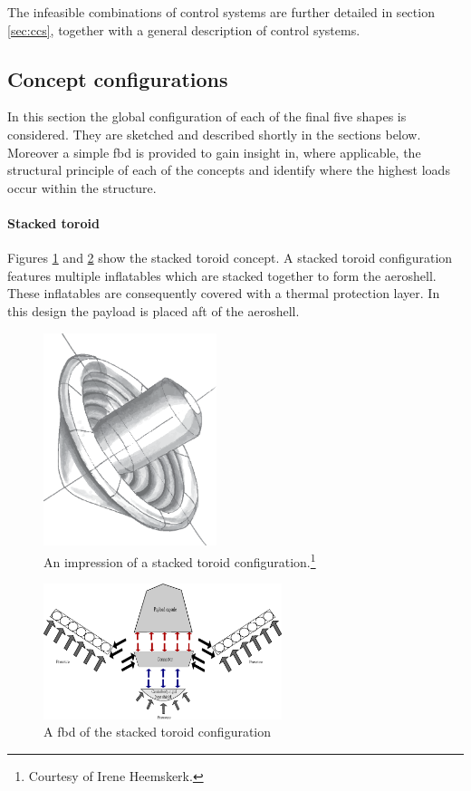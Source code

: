  The infeasible combinations of control systems are further detailed in section \ref{sec:ccs}, together with a general description of control systems. 

\subsection{Concept configurations} \label{sec:conf}
In this section the global configuration of each of the final five shapes is considered. They are sketched and described shortly in the sections below. Moreover a simple \gls{fbd} is provided to gain insight in, where applicable, the structural principle of each of the concepts and identify where the highest loads occur within the structure.

\paragraph{Stacked toroid}

Figures \ref{fig:conc_stacked} and \ref{fig:fbd_stacked} show the stacked toroid concept. A stacked toroid configuration features multiple inflatables which are stacked together to form the aeroshell. These inflatables are consequently covered with a thermal protection layer. In this design the payload is placed aft of the aeroshell.

\begin{figure}[H]
\centering
\includegraphics[width = 0.45\textwidth]{Figure/stacked_toroid.eps}
\caption[An impression of a stacked toroid configuration.]{An impression of a stacked toroid configuration.\footnote{\label{ftn:irene}Courtesy of Irene Heemskerk.}}
\label{fig:conc_stacked}
\end{figure}

\begin{figure}[H]
\centering
\includegraphics[width = 0.62\textwidth]{Figure/FBD_stacked.eps}
\caption{A \gls{fbd} of the stacked toroid configuration}
\label{fig:fbd_stacked}
\end{figure}

